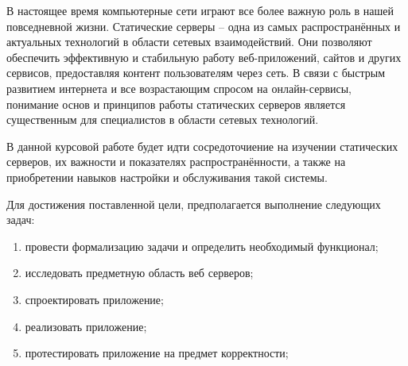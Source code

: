 
В настоящее время компьютерные сети играют все более важную роль в нашей повседневной жизни. Статические серверы – одна из самых распространённых и актуальных технологий в области сетевых взаимодействий. Они позволяют обеспечить эффективную и стабильную работу веб-приложений, сайтов и других сервисов, предоставляя контент пользователям через сеть. В связи с быстрым развитием интернета и все возрастающим спросом на онлайн-сервисы, понимание основ и принципов работы статических серверов является существенным для специалистов в области сетевых технологий. 

В данной курсовой работе будет идти сосредоточиение на изучении статических серверов, их важности и показателях распространённости, а также на приобретении навыков настройки и обслуживания такой системы.

Для достижения поставленной цели, предполагается выполнение следующих задач:
\begin{enumerate}
    \item провести формализацию задачи и определить необходимый функционал;
    \item исследовать предметную область веб серверов;
    \item спроектировать приложение;
    \item реализовать приложение;
    \item протестировать приложение на предмет корректности;
\end{enumerate}
